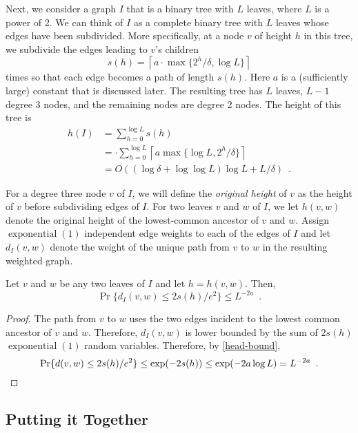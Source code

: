 \documentclass[lotsofwhite]{patmorin}
\DeclareMathOperator{\exponential}{exponential}
\begin{document}
Next, we consider a graph $I$ that is a binary tree with $L$ leaves,
where $L$ is a power of 2.  We can think of $I$ as a complete binary tree
with $L$ leaves whose edges have been subdivided.  More specifically,
at a node $v$ of height $h$ in this tree, we subdivide the edges leading
to $v$'s children
\[
   s(h) = \left\lceil a\cdot\max\{2^h/\delta,\log L\}\right\rceil 
\]
times so that each edge becomes a path of length $s(h)$.  Here $a$ is a
(sufficiently large) constant that is discussed later.  The resulting
tree has $L$ leaves, $L-1$ degree 3 nodes, and the remaining nodes are
degree 2 nodes.  The height of this tree is
\begin{align*}
   h(I) & = \sum_{h=0}^{\log L} s(h) \\
        & = \cdot\sum_{h=0}^{\log L} \left\lceil a\max\{\log L, 2^h/\delta\}\right\rceil \\
        & = O( (\log\delta+\log\log L)\log L + L/\delta ) \enspace .
\end{align*}

For a degree three node $v$ of $I$, we will define the \emph{original
height} of $v$ as the height of $v$ before subdividing edges of $I$.  For
two leaves $v$ and $w$ of $I$, we let $h(v,w)$ denote the original height
of the lowest-common ancestor of $v$ and $w$.  Assign $\exponential(1)$
independent edge weights to each of the edges of $I$ and let $d_I(v,w)$
denote the weight of the unique path from $v$ to $w$ in the resulting
weighted graph.


\begin{lem}
   Let $v$ and $w$ be any two leaves of $I$ and let $h=h(v,w)$. Then,
   \[  
        \Pr\{d_I(v,w) \le 2s(h)/e^2  \} \le L^{-2a} \enspace .
   \]
\end{lem}

\begin{proof}
   The path from $v$ to $w$ uses the two edges incident to the lowest
   common ancestor of $v$ and $w$.  Therefore, $d_I(v,w)$ is lower bounded
   by the sum of $2s(h)$ $\exponential(1)$ random variables. Therefore, 
   by \eqref{head-bound},
   \[
      \Pr\{d(v,w) \le 2s(h)/e^2  \} 
       \le \exp(-2s(h)) \le \exp(-2a\log L) = L^{-2a} \enspace . \qedhere
   \]
\end{proof}

\subsection{Putting it Together}
\end{document}
